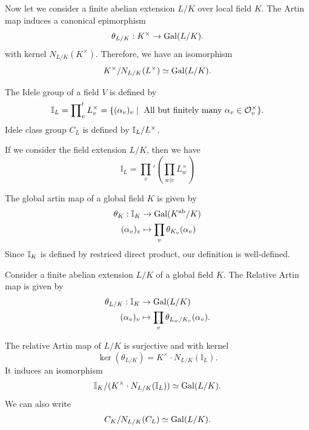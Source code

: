 {Now let we consider a finite abelian extension $L/K$ over local field $K$. The Artin map induces a canonical epimorphism
\begin{align*}
    \theta_{L/K}: K^\times \to \operatorname{Gal}(L/K).
\end{align*}
with kernel $N_{L/K}(K^\times)$. Therefore, we have an isomorphism 
\begin{align*}
    K^\times/N_{L/K}(L^\times)\simeq  \operatorname{Gal}(L/K).
\end{align*}


\begin{definition}
    The Idele group of a field $V$ is defined by 
$$\mathbb{I}_L = \prod_{v} \nolimits' L_v^\times = \{ (\alpha_v)_{v} \mid  \text{ All but finitely many } \alpha_v \in \mathcal{O}_v^\times \}.$$
Idele class group $C_L$ is defined by $\mathbb{I}_L/L^\times$.
\end{definition}

If we consider the field extension $L/K$, then we have 
$$\mathbb{I}_L = \prod_{v}\nolimits' \left( \prod_{w|v} L_w^\times \right)$$

\begin{definition}
    The global artin map of a global field $K$ is given by 
    \begin{align*}
        \theta_K : \mathbb{I}_K &\to \operatorname{Gal}(K^{\text{ab}}/K)\\
        (\alpha_v)_v&\mapsto \prod_{v}\theta_{K_v}(\alpha_v)
    \end{align*}
    Since $\mathbb{I}_K$ is defined by restriced direct product, our definition is well-defined.
\end{definition}

\begin{definition}
    Consider a finite abelian extension $L/K$ of a global field $K$. The Relative Artin map is given by 
    \begin{align*}
        \theta_{L/K}: \mathbb{I}_K &\to \operatorname{Gal}(L/K)\\
        (\alpha_v)_v&\mapsto \prod_{v}\theta_{L_w/K_v}(\alpha_v).
    \end{align*}
\end{definition}

\begin{theorem}
    The relative Artin map of $L/K$ is surjective and with kernel $$\ker(\theta_{L/K}) = K^\times \cdot N_{L/K}(\mathbb{I}_L).$$
    It induces an isomorphism 
    \begin{align*}
         \mathbb{I}_K/(K^\times \cdot N_{L/K}(\mathbb{I}_L)) \simeq \operatorname{Gal}(L/K).
    \end{align*}
    We can also write 
    \begin{align*}
        C_K/N_{L/K}(C_L) \simeq \operatorname{Gal}(L/K).
    \end{align*}
\end{theorem}

}

